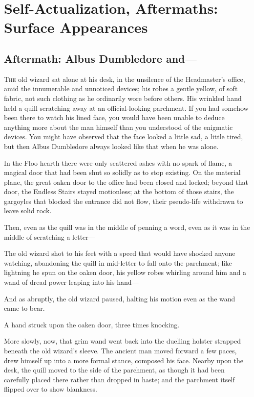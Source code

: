 \chapter{Self-Actualization, Aftermaths: Surface Appearances}

\section{Aftermath: Albus Dumbledore and—}

\lettrine{T}{he} old wizard sat alone at his desk, in the unsilence of the Headmaster’s office, amid the innumerable and unnoticed devices; his robes a gentle yellow, of soft fabric, not such clothing as he ordinarily wore before others. His wrinkled hand held a quill scratching away at an official-looking parchment. If you had somehow been there to watch his lined face, you would have been unable to deduce anything more about the man himself than you understood of the enigmatic devices. You might have observed that the face looked a little sad, a little tired, but then Albus Dumbledore always looked like that when he was alone.

In the Floo hearth there were only scattered ashes with no spark of flame, a magical door that had been shut so solidly as to stop existing. On the material plane, the great oaken door to the office had been closed and locked; beyond that door, the Endless Stairs stayed motionless; at the bottom of those stairs, the gargoyles that blocked the entrance did not flow, their pseudo-life withdrawn to leave solid rock.

Then, even as the quill was in the middle of penning a word, even as it was in the middle of scratching a letter—

The old wizard shot to his feet with a speed that would have shocked anyone watching, abandoning the quill in mid-letter to fall onto the parchment; like lightning he spun on the oaken door, his yellow robes whirling around him and a wand of dread power leaping into his hand—

And as abruptly, the old wizard paused, halting his motion even as the wand came to bear.

A hand struck upon the oaken door, three times knocking.

More slowly, now, that grim wand went back into the duelling holster strapped beneath the old wizard’s sleeve. The ancient man moved forward a few paces, drew himself up into a more formal stance, composed his face. Nearby upon the desk, the quill moved to the side of the parchment, as though it had been carefully placed there rather than dropped in haste; and the parchment itself flipped over to show blankness.

